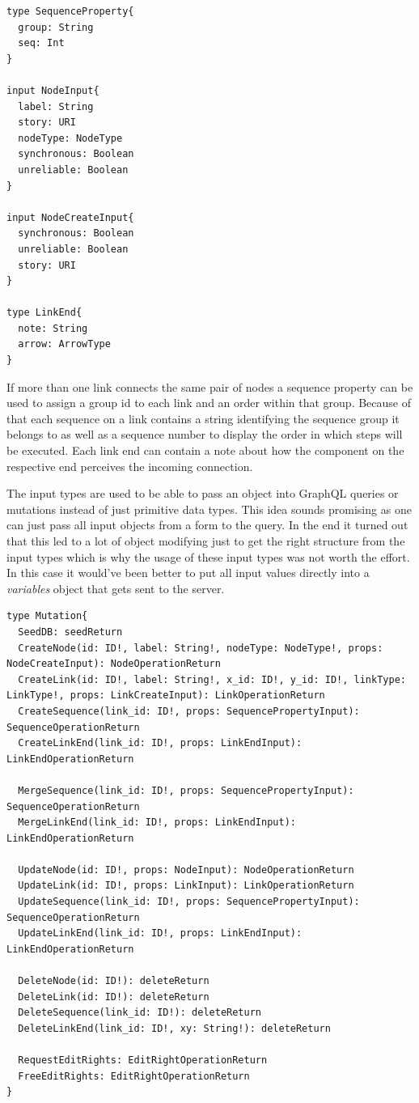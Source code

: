 \begin{lstlisting}[caption={Input Type Definitions}]
type SequenceProperty{
  group: String
  seq: Int
}

input NodeInput{
  label: String
  story: URI
  nodeType: NodeType
  synchronous: Boolean
  unreliable: Boolean
}

input NodeCreateInput{
  synchronous: Boolean
  unreliable: Boolean
  story: URI
}

type LinkEnd{
  note: String
  arrow: ArrowType
}
\end{lstlisting}
If more than one link connects the same pair of nodes a sequence property can be used to assign a group id to each link and an order within that group. Because of that each sequence on a link contains a string identifying the sequence group it belongs to as well as a sequence number to display the order in which steps will be executed. Each link end can contain a note about how the component on the respective end perceives the incoming connection.

The input types are used to be able to pass an object into GraphQL queries or mutations instead of just primitive data types. This idea sounds promising as one can just pass all input objects from a form to the query. In the end it turned out that this led to a lot of object modifying just to get the right structure from the input types which is why the usage of these input types was not worth the effort. In this case it would've been better to put all input values directly into a \emph{variables} object that gets sent to the server.

\newpage
\begin{lstlisting}[caption={Mutation Type Definition},label={mutations}]
type Mutation{
  SeedDB: seedReturn
  CreateNode(id: ID!, label: String!, nodeType: NodeType!, props: NodeCreateInput): NodeOperationReturn
  CreateLink(id: ID!, label: String!, x_id: ID!, y_id: ID!, linkType: LinkType!, props: LinkCreateInput): LinkOperationReturn
  CreateSequence(link_id: ID!, props: SequencePropertyInput): SequenceOperationReturn
  CreateLinkEnd(link_id: ID!, props: LinkEndInput): LinkEndOperationReturn

  MergeSequence(link_id: ID!, props: SequencePropertyInput): SequenceOperationReturn
  MergeLinkEnd(link_id: ID!, props: LinkEndInput): LinkEndOperationReturn

  UpdateNode(id: ID!, props: NodeInput): NodeOperationReturn
  UpdateLink(id: ID!, props: LinkInput): LinkOperationReturn
  UpdateSequence(link_id: ID!, props: SequencePropertyInput): SequenceOperationReturn
  UpdateLinkEnd(link_id: ID!, props: LinkEndInput): LinkEndOperationReturn

  DeleteNode(id: ID!): deleteReturn
  DeleteLink(id: ID!): deleteReturn
  DeleteSequence(link_id: ID!): deleteReturn
  DeleteLinkEnd(link_id: ID!, xy: String!): deleteReturn

  RequestEditRights: EditRightOperationReturn
  FreeEditRights: EditRightOperationReturn
}
\end{lstlisting}

